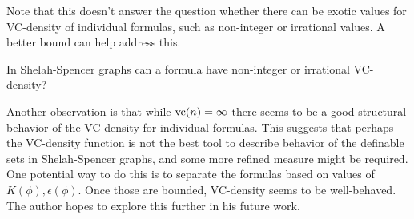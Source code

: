 Note that this \chapa doesn't answer the question whether there can be exotic values for VC-density of individual formulas,
such as non-integer or irrational values.
A better bound can help address this.
\begin{openq}
  In Shelah-Spencer graphs can a formula have non-integer or irrational VC-density?
\end{openq}
Another observation is that while $\operatorname{vc}(n) = \infty$ there seems to be a good structural behavior of the VC-density for individual formulas.
This suggests that perhaps the VC-density function is not the best tool to describe behavior of the definable sets in Shelah-Spencer graphs,
and some more refined measure might be required.
One potential way to do this is to separate the formulas based on values of $K(\phi), \epsilon(\phi)$.
Once those are bounded, VC-density seems to be well-behaved.
The author hopes to explore this further in his future work.
